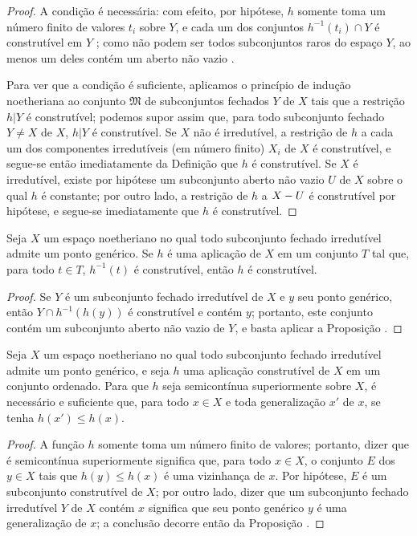 \begin{proof}
A condição é necessária: com efeito, por hipótese, $h$ somente toma um número finito de valores $t_i$ sobre $Y$, e cada um dos conjuntos $h^{-1}(t_i)\cap Y$ é construtível em $Y$ ; como não podem ser todos subconjuntos raros do espaço $Y$, ao menos um deles contém um aberto não vazio .

Para ver que a condição é suficiente, aplicamos o princípio de indução noetheriana ao conjunto $\mathfrak{M}$ de subconjuntos fechados $Y$ de $X$ tais que a restrição $h|Y$ é construtível; podemos supor assim que, para todo subconjunto fechado $Y\neq X$ de $X$,
$h|Y$ é construtível.
Se $X$ não é irredutível, a restrição de $h$ a cada um dos componentes irredutíveis (em número finito) $X_i$ de $X$ é construtível, e segue-se então imediatamente da Definição  que $h$ é construtível.
Se $X$ é irredutível, existe por hipótese um subconjunto aberto não vazio $U$ de $X$ sobre o qual $h$ é constante; por outro lado, a restrição de $h$ a $X- U$ é construtível por hipótese, e segue-se imediatamente que $h$ é construtível.
\end{proof}

\begin{corollary}[9.3.3]
\label{0.9.3.3}
Seja $X$ um espaço noetheriano no qual todo subconjunto fechado irredutível admite um ponto genérico.
Se $h$ é uma aplicação de $X$ em um conjunto $T$ tal que, para todo $t\in T$, $h^{-1}(t)$ é construtível, então $h$ é construtível.
\end{corollary}

\begin{proof}
Se $Y$ é um subconjunto fechado irredutível de $X$ e $y$ seu ponto genérico, então $Y\cap h^{-1}(h(y))$ é construtível e contém $y$; portanto,  este conjunto contém um subconjunto aberto não vazio de $Y$, e basta aplicar a Proposição .
\end{proof}

\begin{proposition}[9.3.4]
\label{0.9.3.4}
Seja $X$ um espaço noetheriano no qual todo subconjunto fechado irredutível admite um ponto genérico, e seja $h$ uma aplicação construtível de $X$ em um conjunto ordenado.
Para que $h$ seja semicontínua superiormente sobre $X$, é necessário e suficiente que, para todo $x\in X$ e toda generalização  $x'$ de $x$, se tenha $h(x')\leq h(x)$.
\end{proposition}

\begin{proof}
A função $h$ somente toma um número finito de valores; portanto, dizer que é semicontínua superiormente significa que, para todo $x\in X$, o conjunto $E$ dos $y\in X$ tais que $h(y)\leq h(x)$ é uma vizinhança de $x$.
Por hipótese, $E$ é um subconjunto construtível de $X$; por outro lado, dizer que um subconjunto fechado irredutível $Y$ de $X$ contém $x$ significa que seu ponto genérico $y$ é uma generalização de $x$; a conclusão decorre então da Proposição .
\end{proof}
